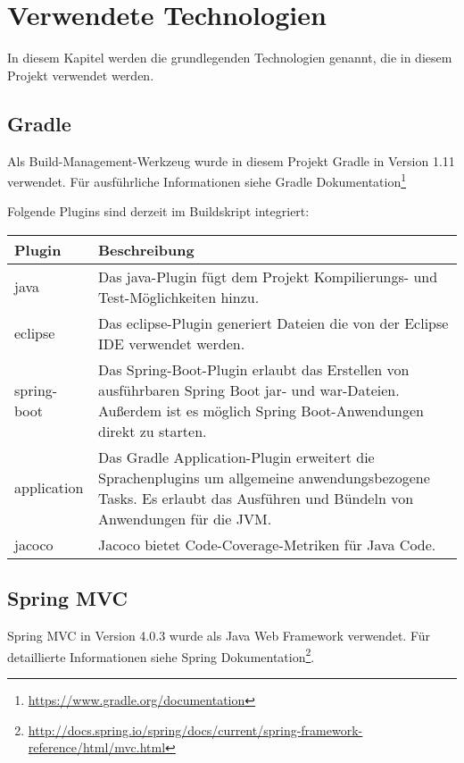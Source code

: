 
\thispagestyle{plain}

\chapter{Verwendete Technologien}\label{c_verTech}
In diesem Kapitel werden die grundlegenden Technologien genannt, die in diesem Projekt verwendet werden.

\section{Gradle}\label{s_gradle}
Als Build-Management-Werkzeug wurde in diesem Projekt Gradle in Version 1.11 verwendet. Für ausführliche Informationen siehe Gradle Dokumentation\footnote{\url{https://www.gradle.org/documentation}}

Folgende Plugins sind derzeit im Buildskript integriert:\\
\begin{tabularx}{\textwidth}{|l|X|} \hline
       \textbf{Plugin}  	& \textbf{Beschreibung} \\ \hline

       java           		& Das java-Plugin fügt dem Projekt Kompilierungs- und Test-Möglichkeiten hinzu.\\\hline
       eclipse           	& Das eclipse-Plugin generiert Dateien die von der Eclipse \ac{IDE} verwendet werden.\\\hline
	   spring-boot          & Das Spring-Boot-Plugin erlaubt das Erstellen von ausführbaren Spring Boot jar- und war-Dateien. Außerdem ist es möglich Spring Boot-Anwendungen direkt zu starten.\\\hline
	   application          & Das Gradle Application-Plugin erweitert die Sprachenplugins um allgemeine anwendungsbezogene Tasks. Es erlaubt das Ausführen und Bündeln von Anwendungen für die \ac{JVM}.\\\hline
       jacoco           	& Jacoco bietet Code-Coverage-Metriken für Java Code.\\\hline
        
\end{tabularx}

\section{Spring MVC}\label{s_springmvc}
Spring MVC in Version 4.0.3 wurde als Java Web Framework verwendet.
Für detaillierte Informationen siehe Spring Dokumentation\footnote{\url{http://docs.spring.io/spring/docs/current/spring-framework-reference/html/mvc.html}}.

